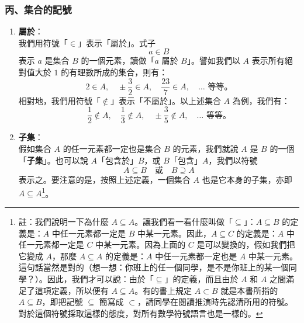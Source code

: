\subsubsection*{丙、集合的記號}\label{subsec:2-3-c}

\begin{enumerate}[(一)]
  \item \textbf{屬於}：\\
  我們用符號「$\in$」表示「屬於」。式子
  \begin{equation}\label{eq:belong_rel}
    a \in B
  \end{equation}
  表示 $a$ 是集合 $B$ 的一個元素，讀做「$a$ 屬於 $B$」。譬如我們以 $A$ 表示所有絕對值大於 $1$ 的有理數所成的集合，則有：
  \begin{equation*}
    2 \in A, \quad \pm \frac{3}{2} \in A, \quad \frac{23}{7} \in A, \quad \dots \text{ 等等。}
  \end{equation*}
  相對地，我們用符號「$\notin$」表示「不屬於」。以上述集合 $A$ 為例，我們有：
  \begin{equation*}
    \frac{1}{2} \notin A, \quad \frac{1}{3} \notin A, \quad \pm \frac{3}{5} \notin A, \quad \dots \text{ 等等。}
  \end{equation*}

  \item \textbf{子集}：\\
  假如集合 $A$ 的任一元素都一定也是集合 $B$ 的元素，我們就說 $A$ 是 $B$ 的一個「\textbf{子集}」。也可以說 $A$「包含於」$B$，或 $B$「包含」$A$，我們以符號
  \begin{equation}\label{eq:subset_rel}
    A \subseteq B \quad \text{或} \quad B \supseteq A
  \end{equation}
  表示之。要注意的是，按照上述定義，一個集合 $A$ 也是它本身的子集，亦即 $A \subseteq A$\footnote{\label{fn:subset_self}註：我們說明一下為什麼 $A \subseteq A$。讓我們看一看什麼叫做「$\subseteq$」：$A \subseteq B$ 的定義是：$A$ 中任一元素都一定是 $B$ 中某一元素。因此，$A \subseteq C$ 的定義是：$A$ 中任一元素都一定是 $C$ 中某一元素。因為上面的 $C$ 是可以變換的，假如我們把它變成 $A$，那麼 $A \subseteq A$ 的定義是：$A$ 中任一元素都一定也是 $A$ 中某一元素。這句話當然是對的（想一想：你班上的任一個同學，是不是你班上的某一個同學？）。因此，我們才可以說：由於「$\subseteq$」的定義，而且由於 $A$ 和 $A$ 之間滿足了這項定義，所以便有 $A \subseteq A$。有的書上規定 $A \subset B$ 就是本書所指的 $A \subseteq B$，即把記號 $\subseteq$ 簡寫成 $\subset$，請同學在閱讀推演時先認清所用的符號。對於這個符號採取這樣的態度，對所有數學符號語言也是一樣的。}。


\end{enumerate}
